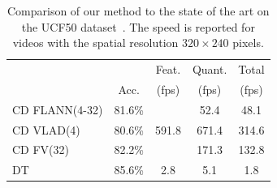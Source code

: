 \documentclass[10pt,twocolumn,letterpaper]{article}
\begin{document}
\begin{table}
\begin{center}
\begin{tabular}{|l|c|c|c|c|}
\hline
		 				&  	 	& Feat.                    & Quant. 	& Total	\\
		 				& Acc.  & (fps)                    & (fps) 	& (fps)	\\\hline
CD FLANN(4-32)	& 81.6\% & \multirow{3}{*}{591.8}   & 52.4  	& 48.1	\\ %
CD VLAD(4) 	 	& 80.6\% &                          & 671.4 	& 314.6	\\ %
CD FV(32)	 		& 82.2\% &                          & 171.3 	& 132.8	\\ %
\hline
DT \cite{Wang12}& 85.6\% & 2.8            	        & 5.1  	& 1.8\\\hline%
\end{tabular}
\smallskip
\caption{Comparison of our method to the state of the art on the UCF50 dataset~\cite{Reddy12}. The speed is reported for videos with the spatial resolution $320\times 240$ pixels.}
\label{tab:ucf_comparison}
\mbox{}\vspace{-1cm}\\
\end{center}
\end{table}
\end{document}
